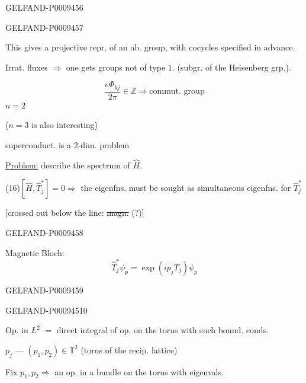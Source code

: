 \begin{GelfandAdjacentEvidence}{GELFAND-P000945}{6}

\end{GelfandAdjacentEvidence}
\begin{GelfandAdjacentEvidence}{GELFAND-P000945}{7}


This gives a projective repr. of an ab. group, with cocycles specified in advance.

Irrat. fluxes $\Rightarrow$ one gets groups not of type 1. (subgr. of the Heisenberg grp.).

\begin{equation*}
 \frac{e\Phi_{kj}}{2\pi}\in\mathbb Z\Rightarrow\text{commut. group}
 \tag{15}
\end{equation*}
$\underline{n=2}$

($n=3$ is also interesting)

superconduct. is a 2-dim. problem

\underline{Problem:} describe the spectrum of $\hat H$.

(16)\quad $[\hat H,\hat T_j^*]=0\Rightarrow$ the eigenfns. must be sought as simultaneous eigenfns. for $\hat T_j^*$

[crossed out below the line: \sout{magn.} (?)]
\end{GelfandAdjacentEvidence}
\begin{GelfandAdjacentEvidence}{GELFAND-P000945}{8}


Magnetic Bloch:
\begin{equation*}
 \hat T_j^*\psi_{p}=\exp(ip_jT_j)\psi_{p}
 \tag{17}
\end{equation*}
\end{GelfandAdjacentEvidence}
\begin{GelfandAdjacentEvidence}{GELFAND-P000945}{9}

\end{GelfandAdjacentEvidence}
\begin{GelfandAdjacentEvidence}{GELFAND-P000945}{10}


Op. in $L^2$ $=$ direct integral of op. on the torus with such bound. conds.

$p_j$ --- \qquad $(p_1,p_2)\in\mathbb T^2$
\qquad (torus of the recip. lattice)

Fix $p_1,p_2\Rightarrow$ an op. in a bundle on the torus with eigenvals.
\end{GelfandAdjacentEvidence}


